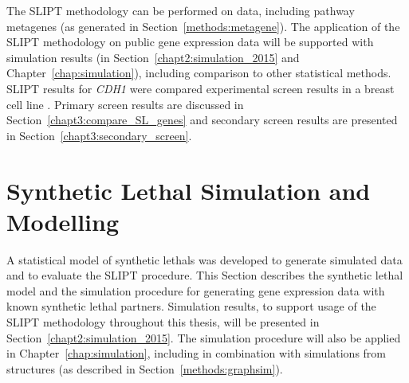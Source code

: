 The \gls{SLIPT} methodology can be performed on  data, including pathway \glspl{metagene} (as generated in Section~\ref{methods:metagene}). The application of the \gls{SLIPT} methodology on public \gls{gene expression} data will be supported with simulation results (in Section~\ref{chapt2:simulation_2015} and Chapter~\ref{chap:simulation}), including comparison to other statistical methods. \gls{SLIPT} results for \textit{CDH1} were compared \textcolor{to the} experimental screen results in a breast cell line \citep{Telford2015}. Primary screen results are discussed in Section~\ref{chapt3:compare_SL_genes} and secondary screen results are presented in Section~\ref{chapt3:secondary_screen}.



\FloatBarrier

\section{Synthetic Lethal Simulation and Modelling} \label{methods:simulation_SL_expression} 

A statistical model of \glspl{synthetic lethal} was developed to generate simulated data and to evaluate the \gls{SLIPT} procedure. This Section describes the \gls{synthetic lethal} model and the simulation procedure for generating \gls{gene expression} data with known \gls{synthetic lethal} partners. Simulation results, to support usage of the \gls{SLIPT} methodology throughout this thesis, will be presented in Section~\ref{chapt2:simulation_2015}. The simulation procedure will also be applied in Chapter~\ref{chap:simulation}, including in combination with simulations from  structures (as described in Section~\ref{methods:graphsim}).

